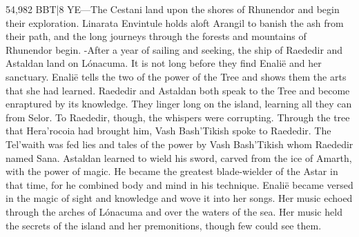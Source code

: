 \documentclass[smalldemyvopaper,11pt,twoside,onecolumn,openright,extrafontsizes]{memoir}
\begin{document}
{{54,982 BBT|8 YE—The Cestani land upon the shores of Rhunendor and begin their exploration. Linarata Envintule holds aloft Arangil to banish the ash from their path, and the long journeys through the forests and mountains of Rhunendor begin.
-After a year of sailing and seeking, the ship of Raededir and Astaldan land on Lónacuma. It is not long before they find Enalië and her sanctuary. Enalië tells the two of the power of the Tree and shows them the arts that she had learned. Raededir and Astaldan both speak to the Tree and become enraptured by its knowledge. They linger long on the island, learning all they can from Selor. To Raededir, though, the whispers were corrupting. Through the tree that Hera’rocoia had brought him, Vash Bash’Tikish spoke to Raededir. The Tel’waith was fed lies and tales of the power by Vash Bash’Tikish whom Raededir named Sana. Astaldan learned to wield his sword, carved from the ice of Amarth, with the power of magic. He became the greatest blade-wielder of the Astar in that time, for he combined body and mind in his technique. Enalië became versed in the magic of sight and knowledge and wove it into her songs. Her music echoed through the arches of Lónacuma and over the waters of the sea. Her music held the secrets of the island and her premonitions, though few could see them.

}}
\end{document}
